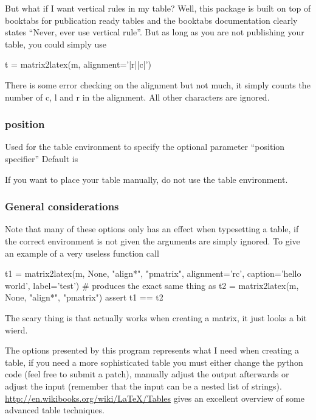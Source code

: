 {{But what if I want vertical rules in my table? Well, this package is built
on top of booktabs for publication ready tables and the booktabs documentation clearly
states ``Never, ever use vertical rule''. But as long as you are not publishing your table,
you could simply use
\begin{pyblock}
t = matrix2latex(m, alignment='|r||c|')
\end{pyblock}

There is some error checking on the alignment but not much, it simply counts the number
of c, l and r in the alignment. All other characters are ignored.

\subsubsection{position}
Used for the table environment to specify the optional parameter ``position specifier''
Default is 

If you want to place your table manually, do not use the table environment.

\subsubsection{General considerations}
Note that many of these options only has an effect when typesetting a table,
if the correct environment is not given the arguments are simply ignored.
To give an example of a very useless function call
\begin{pyblock}
t1 = matrix2latex(m, None, "align*", "pmatrix",
                 alignment='rc',
                 caption='hello world',
                 label='test')
# produces the exact same thing as
t2 = matrix2latex(m, None, "align*", "pmatrix")
assert t1 == t2
\end{pyblock}
The scary thing is that  actually works when creating a matrix,
it just looks a bit wierd.

The options presented by this program represents what I need when creating a table,
if you need a more sophisticated table you must either change the python code
(feel free to submit a patch), manually adjust the output afterwards
or adjust the input (remember that the input can be a nested list of strings).
\url{http://en.wikibooks.org/wiki/LaTeX/Tables} gives an excellent overview
of some advanced table techniques.

}}
